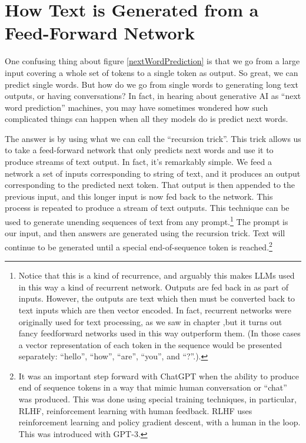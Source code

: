 \section{How Text is Generated from a Feed-Forward Network}


One confusing thing about figure \ref{nextWordPrediction} is that we go from a large input covering a whole set of tokens to a single token as output. So great, we can predict single words. But how do we go from single words to generating long text outputs, or having conversations? In fact, in hearing about generative AI as ``next word prediction'' machines, you may have sometimes wondered how such complicated things can happen when all they models do is predict next words.

The answer is by using what we can call the ``recursion trick''. This trick allows us to take a feed-forward network that only predicts next words and use it to produce streams of text output. In fact, it's remarkably simple. We feed a network a set of inputs corresponding to string of text, and it produces an output corresponding to the predicted next token. That output is then appended to the previous input, and this longer input is now fed back to the network. This process is repeated to produce a stream of text outputs. This technique can be used to generate unending sequences of text from any prompt.\footnote{Notice that this is a kind of recurrence, and arguably this makes LLMs used in this way a kind of recurrent network. Outputs are fed back in as part of inputs. However, the outputs are text which then must be converted back to text inputs which are then vector encoded. In fact, recurrent networks were originally used for text processing, as we saw in chapter ,but it turns out fancy feedforward networks used in this way outperform them. (In those cases a vector representation of each token in the sequence would be presented separately: ``hello'', ``how'', ``are'', ``you'', and ``?''.).} The prompt is our input, and then answers are generated using the recursion trick. Text will continue to be generated until a special end-of-sequence token is reached.\footnote{It was an important step forward with ChatGPT when the ability to produce end of sequence tokens in a way that mimic human conversation or ``chat'' was produced. This was done using special training techniques, in particular, RLHF, reinforcement learning with human feedback. RLHF uses reinforcement learning and policy gradient descent, with a human in the loop. This was introduced with GPT-3.} 

